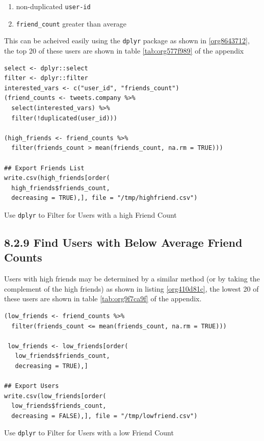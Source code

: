 \documentclass[11pt]{article}
\begin{document}
\begin{enumerate}
\item non-duplicated \texttt{user-id}
\item \texttt{friend\_count} greater than average
\end{enumerate}

This can be acheived easily using the \texttt{dplyr} package as shown in \ref{org8643712}, the top 20 of these users are shown in table \ref{tab:org577f989} of the appendix

\begin{listing}[htbp]
\begin{verbatim}
select <- dplyr::select
filter <- dplyr::filter
interested_vars <- c("user_id", "friends_count")
(friend_counts <- tweets.company %>%
  select(interested_vars) %>%
  filter(!duplicated(user_id)))

(high_friends <- friend_counts %>%
  filter(friends_count > mean(friends_count, na.rm = TRUE)))

## Export Friends List
write.csv(high_friends[order(
  high_friends$friends_count,
  decreasing = TRUE),], file = "/tmp/highfriend.csv")
\end{verbatim}
\caption{\label{org8643712}Use \texttt{dplyr} to Filter for Users with a high Friend Count}
\end{listing}

\subsection{8.2.9 Find Users with Below Average Friend Counts}
\label{sec:org896c32f}
Users with high friends may be determined by a similar method (or by taking the complement of the high friends) as shown in listing \ref{org410d81c}, the lowest 20 of these users are shown in table \ref{tab:org9f7ca9f} of the appendix.

\begin{listing}[htbp]
\begin{verbatim}
(low_friends <- friend_counts %>%
  filter(friends_count <= mean(friends_count, na.rm = TRUE)))

 low_friends <- low_friends[order(
   low_friends$friends_count,
   decreasing = TRUE),]

## Export Users
write.csv(low_friends[order(
  low_friends$friends_count,
  decreasing = FALSE),], file = "/tmp/lowfriend.csv")
\end{verbatim}
\caption{\label{org410d81c}Use \texttt{dplyr} to Filter for Users with a low Friend Count}
\end{listing}
\end{document}
